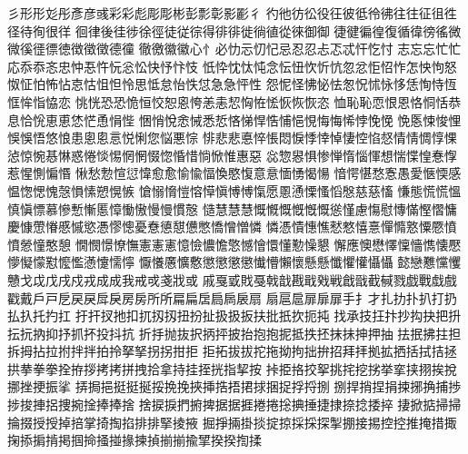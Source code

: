 彡󠄀形󠄀形󠄁彣󠄀彤󠄀彥󠄀彦󠄀彧󠄀彩󠄀彩󠄁彪󠄀彫󠄀彫󠄁彬󠄀彭󠄀彯󠄀彰󠄀影󠄀彲󠄀彳󠄀
彴󠄀彵󠄀彷󠄀彸󠄀役󠄀彺󠄀彼󠄀彽󠄀彾󠄀彿󠄀往󠄀往󠄁征󠄀徂󠄀徃󠄀径󠄀待󠄀徇󠄀很󠄀徉󠄀
徊󠄀律󠄀後󠄀徍󠄀徏󠄀徐󠄀徑󠄀徒󠄀従󠄀徖󠄀得󠄀徘󠄀徘󠄁徙󠄀徜󠄀徝󠄀從󠄀徠󠄀御󠄀御󠄁
徢󠄀徤󠄀徧󠄀徨󠄀復󠄀循󠄀徫󠄀徬󠄀徭󠄀微󠄀微󠄁徯󠄀徰󠄀徱󠄀徳󠄀徴󠄀徵󠄀徵󠄁德󠄀徸󠄀
徹󠄀徼󠄀徽󠄀徽󠄁心󠄀忄󠄀必󠄀忇󠄀忈󠄀忉󠄀忋󠄀忌󠄀忍󠄀忍󠄁忐󠄀忑󠄀忒󠄀忓󠄀忔󠄀忖󠄀
志󠄀忘󠄀忘󠄁忙󠄀忙󠄁応󠄀忝󠄀忝󠄁忞󠄀忠󠄀忡󠄀忢󠄀忤󠄀忨󠄀忩󠄀忪󠄀快󠄀忬󠄀忭󠄀忮󠄀
忯󠄀忰󠄀忱󠄀忲󠄀忳󠄀念󠄀忶󠄀忸󠄀忺󠄀忻󠄀忼󠄀忽󠄀忿󠄀怇󠄀怊󠄀怍󠄀怎󠄀怏󠄀怐󠄀怒󠄀
怓󠄀怔󠄀怕󠄀怖󠄀怗󠄀怘󠄀怙󠄀怚󠄀怛󠄀怜󠄀思󠄀怟󠄀怠󠄀怡󠄀怢󠄀怤󠄀急󠄀急󠄁怦󠄀性󠄀
怨󠄀怩󠄀怪󠄀怫󠄀怭󠄀怯󠄀怱󠄀怳󠄀怵󠄀怺󠄀恀󠄀恁󠄀恂󠄀恃󠄀恆󠄀恇󠄀恈󠄀恉󠄀恊󠄀恋󠄀
恌󠄀恍󠄀恐󠄀恐󠄁恑󠄀恒󠄀恔󠄀恕󠄀恖󠄀恗󠄀恙󠄀恚󠄀恝󠄀恟󠄀恠󠄀恡󠄀恢󠄀恢󠄁恢󠄂恣󠄀
恤󠄀恥󠄀恥󠄁恧󠄀恨󠄀恩󠄀恪󠄀恫󠄀恬󠄀恭󠄀息󠄀恰󠄀恱󠄀恵󠄀恵󠄁恷󠄀恾󠄀恿󠄀悁󠄀悂󠄀
悃󠄀悄󠄀悅󠄀悆󠄀悈󠄀悉󠄀悊󠄀悋󠄀悌󠄀悍󠄀悎󠄀悑󠄀悒󠄀悓󠄀悔󠄀悔󠄁悕󠄀悖󠄀悗󠄀悗󠄁
悗󠄂悘󠄀悚󠄀悛󠄀悝󠄀悞󠄀悞󠄁悟󠄀悠󠄀悢󠄀患󠄀悤󠄀悤󠄁悥󠄀悦󠄀悧󠄀您󠄀悩󠄀悪󠄀悰󠄀
悱󠄀悲󠄀悲󠄁悳󠄀悴󠄀悵󠄀悶󠄀悷󠄀悸󠄀悻󠄀悼󠄀悽󠄀悾󠄀惂󠄀惄󠄀情󠄀情󠄁惆󠄀惇󠄀惈󠄀
惉󠄀惊󠄀惋󠄀惎󠄀惏󠄀惑󠄀惓󠄀惔󠄀惕󠄀惘󠄀惘󠄁惙󠄀惚󠄀惛󠄀惜󠄀惝󠄀惞󠄀惟󠄀惠󠄀惡󠄀
惢󠄀惣󠄀惥󠄀惧󠄀惨󠄀惮󠄀惰󠄀惱󠄀惲󠄀想󠄀惴󠄀惵󠄀惶󠄀惷󠄀惸󠄀惹󠄀惺󠄀惻󠄀惼󠄀惽󠄀
愀󠄀愁󠄀愂󠄀愃󠄀愆󠄀愇󠄀愈󠄀愈󠄁愉󠄀愉󠄁愊󠄀愌󠄀愍󠄀愎󠄀意󠄀意󠄁愐󠄀愑󠄀愒󠄀愓󠄀
愔󠄀愕󠄀愖󠄀愗󠄀愙󠄀愚󠄀愛󠄀愜󠄀愞󠄀感󠄀愠󠄀愡󠄀愢󠄀愧󠄀愨󠄀愪󠄀愫󠄀愬󠄀愰󠄀愱󠄀
愴󠄀愵󠄀愶󠄀愷󠄀愹󠄀愺󠄀愼󠄀愽󠄀愽󠄁愾󠄀愿󠄀慁󠄀慂󠄀慄󠄀慅󠄀慆󠄀慇󠄀慈󠄀慈󠄁慉󠄀
慊󠄀態󠄀慌󠄀慌󠄁慍󠄀慎󠄀慎󠄁慓󠄀慕󠄀慘󠄀慙󠄀慚󠄀慝󠄀慞󠄀慟󠄀慠󠄀慢󠄀慢󠄁慣󠄀慤󠄀
慥󠄀慧󠄀慧󠄁慧󠄂慨󠄀慨󠄁慨󠄂慨󠄃慨󠄄慨󠄅慫󠄀慬󠄀慮󠄀慯󠄀慰󠄀慱󠄀慲󠄀慳󠄀慴󠄀慵󠄀
慶󠄀慷󠄀慸󠄀慻󠄀慼󠄀慽󠄀慾󠄀慿󠄀憀󠄀憁󠄀憂󠄀憃󠄀憄󠄀憇󠄀憊󠄀憋󠄀憍󠄀憎󠄀憎󠄁憐󠄀
憐󠄁憑󠄀憒󠄀憓󠄀憔󠄀憖󠄀憗󠄀憘󠄀憙󠄀憚󠄀憜󠄀憝󠄀憟󠄀憠󠄀憤󠄀憤󠄁憥󠄀憧󠄀憨󠄀憩󠄀
憪󠄀憫󠄀憬󠄀憭󠄀憮󠄀憲󠄀憲󠄁憲󠄂憶󠄀憸󠄀憹󠄀憺󠄀憼󠄀憾󠄀懀󠄀懁󠄀懂󠄀懃󠄀懆󠄀懇󠄀
懈󠄀應󠄀懊󠄀懋󠄀懌󠄀懍󠄀懎󠄀懏󠄀懐󠄀懕󠄀懜󠄀懝󠄀懞󠄀懟󠄀懡󠄀懢󠄀懣󠄀懥󠄀懦󠄀懧󠄀
懨󠄀懩󠄀懬󠄀懭󠄀懯󠄀懲󠄀懲󠄁懲󠄂懲󠄃懴󠄀懵󠄀懶󠄀懷󠄀懸󠄀懸󠄁懺󠄀懼󠄀懽󠄀懾󠄀懾󠄁
懿󠄀戀󠄀戁󠄀戃󠄀戄󠄀戇󠄀戈󠄀戉󠄀戊󠄀戌󠄀戍󠄀戎󠄀成󠄀成󠄁我󠄀戒󠄀戓󠄀戔󠄀戕󠄀或󠄀
戚󠄀戛󠄀戜󠄀戝󠄀戞󠄀戟󠄀戠󠄀戡󠄀戢󠄀戣󠄀戦󠄀戧󠄀戩󠄀截󠄀戫󠄀戮󠄀戯󠄀戰󠄀戱󠄀戲󠄀
戳󠄀戴󠄀戶󠄀戸󠄀戹󠄀戻󠄀戻󠄁戽󠄀戾󠄀房󠄀房󠄁所󠄀所󠄁扁󠄀扁󠄁扂󠄀扃󠄀扄󠄀扆󠄀扇󠄀
扇󠄁扈󠄀扈󠄁扉󠄀扉󠄁扉󠄂手󠄀扌󠄀才󠄀扎󠄀扐󠄀扑󠄀扒󠄀打󠄀扔󠄀払󠄀扖󠄀托󠄀扚󠄀扛󠄀
扜󠄀扞󠄀扠󠄀扡󠄀扣󠄀扤󠄀扨󠄀扨󠄁扭󠄀扮󠄀扯󠄀扱󠄀扱󠄁扳󠄀扶󠄀批󠄀扺󠄀扻󠄀扼󠄀扽󠄀
找󠄀承󠄀技󠄀抂󠄀抃󠄀抄󠄀抅󠄀抉󠄀把󠄀抍󠄀抎󠄀抏󠄀抐󠄀抑󠄀抒󠄀抓󠄀抔󠄀投󠄀抖󠄀抗󠄀
折󠄀抙󠄀抛󠄀抜󠄀択󠄀抦󠄀抨󠄀披󠄀抬󠄀抱󠄀抱󠄁抳󠄀抵󠄀抶󠄀抷󠄀抹󠄀抺󠄀抻󠄀押󠄀抽󠄀
抾󠄀抿󠄀拂󠄀拄󠄀担󠄀拆󠄀拇󠄀拈󠄀拉󠄀拊󠄀拌󠄀拌󠄁拍󠄀拎󠄀拏󠄀拏󠄁拐󠄀拐󠄁拑󠄀拒󠄀
拒󠄁拓󠄀拔󠄀拔󠄁拕󠄀拖󠄀拗󠄀拘󠄀拙󠄀拚󠄀招󠄀拜󠄀拝󠄀拠󠄀拡󠄀拪󠄀括󠄀拭󠄀拮󠄀拯󠄀
拱󠄀拲󠄀拳󠄀拳󠄁拴󠄀拵󠄀拶󠄀拷󠄀拷󠄁拼󠄀拽󠄀拾󠄀拿󠄀持󠄀挂󠄀挃󠄀挄󠄀指󠄀挈󠄀按󠄀
挊󠄀挋󠄀挌󠄀挍󠄀挐󠄀挑󠄀挓󠄀挖󠄀挘󠄀挙󠄀挛󠄀挟󠄀挧󠄀挨󠄀挩󠄀挪󠄀挫󠄀挭󠄀振󠄀挲󠄀
挵󠄀挶󠄀挹󠄀挺󠄀挺󠄁挻󠄀挼󠄀挽󠄀挽󠄁挾󠄀挿󠄀捁󠄀捂󠄀捃󠄀捄󠄀捆󠄀捉󠄀捊󠄀捋󠄀捌󠄀
捌󠄁捍󠄀捎󠄀捏󠄀捐󠄀捒󠄀捓󠄀捔󠄀捕󠄀捗󠄀捗󠄁捘󠄀捙󠄀捛󠄀捜󠄀捥󠄀捦󠄀捧󠄀捧󠄁捨󠄀
捨󠄁捩󠄀捩󠄁捫󠄀捬󠄀捭󠄀据󠄀据󠄁捱󠄀捲󠄀捲󠄁捴󠄀捵󠄀捶󠄀捷󠄀捸󠄀捺󠄀捻󠄀捼󠄀捽󠄀
捿󠄀掀󠄀掂󠄀掃󠄀掃󠄁掄󠄀掇󠄀授󠄀授󠄁掉󠄀掊󠄀掌󠄀掎󠄀掏󠄀掐󠄀排󠄀排󠄁掔󠄀掕󠄀掖󠄀
掘󠄀掙󠄀掚󠄀掛󠄀掞󠄀掟󠄀掠󠄀採󠄀採󠄁探󠄀掣󠄀掤󠄀接󠄀掦󠄀控󠄀控󠄁推󠄀掩󠄀措󠄀掫󠄀
掬󠄀掭󠄀掮󠄀掯󠄀掲󠄀掴󠄀掵󠄀掻󠄀掽󠄀掾󠄀揀󠄀揁󠄀揃󠄀揃󠄁揄󠄀揅󠄀揆󠄀揆󠄁揈󠄀揉󠄀
